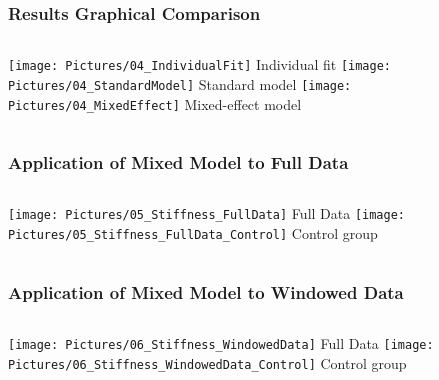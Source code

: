 \documentclass[xcolor=table]{beamer}
\begin{document}

\begin{frame}
	\frametitle{Results Graphical Comparison}
	\begin{columns}[c]
		\centering
		\vfill
		\texttt{[image: Pictures/04\_IndividualFit]}
		Individual fit
		\vfill
		\centering
		\vfill
		\texttt{[image: Pictures/04\_StandardModel]}
		Standard model
		\vfill
		\centering
		\vfill
		\texttt{[image: Pictures/04\_MixedEffect]}
		Mixed-effect model
		\vfill
	\end{columns}
\end{frame}


\begin{frame}
	\frametitle{Application of Mixed Model to Full Data}
	\begin{columns}[c]
		\centering
		\vfill
		\texttt{[image: Pictures/05\_Stiffness\_FullData]}
		Full Data
		\vfill
		\centering
		\vfill
		\texttt{[image: Pictures/05\_Stiffness\_FullData\_Control]}
		Control group
		\vfill
	\end{columns}
\end{frame}


\begin{frame}
	\frametitle{Application of Mixed Model to Windowed Data}
	\begin{columns}[c]
		\centering
		\vfill
		\texttt{[image: Pictures/06\_Stiffness\_WindowedData]}
		Full Data
		\vfill
		\centering
		\vfill
		\texttt{[image: Pictures/06\_Stiffness\_WindowedData\_Control]}
		Control group
		\vfill
	\end{columns}
\end{frame}
\end{document}
